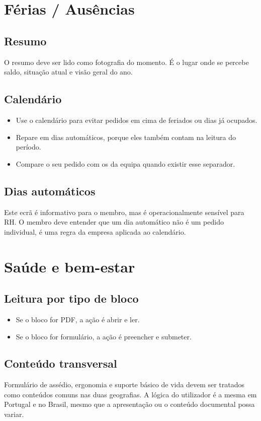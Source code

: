 \section{Férias / Ausências}
\subsection{Resumo}
O resumo deve ser lido como fotografia do momento. É o lugar onde se percebe saldo, situação atual e visão geral do ano.

\subsection{Calendário}
\begin{itemize}
  \item Use o calendário para evitar pedidos em cima de feriados ou dias já ocupados.
  \item Repare em dias automáticos, porque eles também contam na leitura do período.
  \item Compare o seu pedido com os da equipa quando existir esse separador.
\end{itemize}

\subsection{Dias automáticos}
Este ecrã é informativo para o membro, mas é operacionalmente sensível para RH. O membro deve entender que um dia automático não é um pedido individual, é uma regra da empresa aplicada ao calendário.

\section{Saúde e bem-estar}
\subsection{Leitura por tipo de bloco}
\begin{itemize}
  \item Se o bloco for PDF, a ação é abrir e ler.
  \item Se o bloco for formulário, a ação é preencher e submeter.
\end{itemize}

\subsection{Conteúdo transversal}
Formulário de assédio, ergonomia e suporte básico de vida devem ser tratados como conteúdos comuns nas duas geografias. A lógica do utilizador é a mesma em Portugal e no Brasil, mesmo que a apresentação ou o conteúdo documental possa variar.

